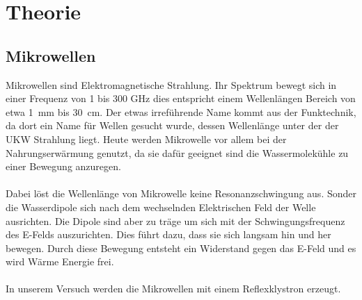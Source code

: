 \section{Theorie}
\label{sec:Theorie}

\subsection{Mikrowellen}
Mikrowellen sind Elektromagnetische Strahlung.
Ihr Spektrum bewegt sich in einer Frequenz von 1 bis 300 \si{\giga\Hz} dies entspricht einem Wellenlängen Bereich von etwa \SI{1}{\milli\meter} bis \SI{30}{\centi\meter}.
Der etwas irreführende Name kommt aus der Funktechnik, da dort ein Name für Wellen gesucht wurde, dessen Wellenlänge unter der der UKW Strahlung liegt.
Heute werden Mikrowelle vor allem bei der Nahrungserwärmung genutzt, da sie dafür geeignet sind die Wassermolekühle zu einer Bewegung anzuregen.
\\\\
Dabei löst die Wellenlänge von Mikrowelle keine Resonanzschwingung aus. 
Sonder die Wasserdipole sich nach dem wechselnden Elektrischen Feld der Welle ausrichten.
Die Dipole sind aber zu träge um sich mit der Schwingungsfrequenz des E-Felds auszurichten. 
Dies führt dazu, dass sie sich langsam hin und her bewegen.
Durch diese Bewegung entsteht ein Widerstand gegen das E-Feld und es wird Wärme Energie frei.
\\\\
In unserem Versuch werden die Mikrowellen mit einem Reflexklystron erzeugt.

